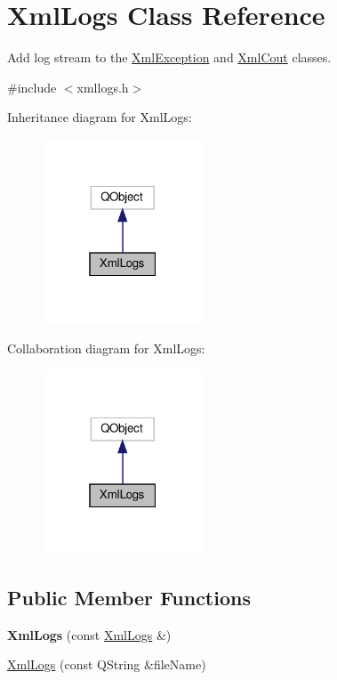 \hypertarget{classXmlLogs}{}\section{Xml\+Logs Class Reference}
\label{classXmlLogs}


Add log stream to the \hyperlink{classXmlException}{Xml\+Exception} and \hyperlink{classXmlCout}{Xml\+Cout} classes.  




{\ttfamily \#include $<$xmllogs.\+h$>$}



Inheritance diagram for Xml\+Logs\+:\nopagebreak
\begin{figure}[H]
\begin{center}
\leavevmode
\includegraphics[width=135pt]{d1/d57/classXmlLogs__inherit__graph}
\end{center}
\end{figure}


Collaboration diagram for Xml\+Logs\+:\nopagebreak
\begin{figure}[H]
\begin{center}
\leavevmode
\includegraphics[width=135pt]{d2/d23/classXmlLogs__coll__graph}
\end{center}
\end{figure}
\subsection*{Public Member Functions}
\begin{DoxyCompactItemize}
\item 
\mbox{\label{classXmlLogs_a6f0877209c80c98e591dbb74ab2f1178}} 
{\bfseries Xml\+Logs} (const \hyperlink{classXmlLogs}{Xml\+Logs} \&)
\item 
\hyperlink{classXmlLogs_a98546fca3a71b0e5c636bfbdac34e383}{Xml\+Logs} (const Q\+String \&file\+Name)
\end{DoxyCompactItemize}


